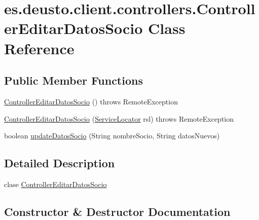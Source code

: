 \hypertarget{classes_1_1deusto_1_1client_1_1controllers_1_1_controller_editar_datos_socio}{}\section{es.\+deusto.\+client.\+controllers.\+Controller\+Editar\+Datos\+Socio Class Reference}
\label{classes_1_1deusto_1_1client_1_1controllers_1_1_controller_editar_datos_socio}
\subsection*{Public Member Functions}
\begin{DoxyCompactItemize}
\item 
\mbox{\hyperlink{classes_1_1deusto_1_1client_1_1controllers_1_1_controller_editar_datos_socio_ac4a645568b10bc53351e97700403d5dd}{Controller\+Editar\+Datos\+Socio}} ()  throws Remote\+Exception 
\item 
\mbox{\hyperlink{classes_1_1deusto_1_1client_1_1controllers_1_1_controller_editar_datos_socio_abddd458cf9a7536335bf85d8431e0e82}{Controller\+Editar\+Datos\+Socio}} (\mbox{\hyperlink{classes_1_1deusto_1_1client_1_1remote_1_1_service_locator}{Service\+Locator}} rsl)  throws Remote\+Exception 
\item 
boolean \mbox{\hyperlink{classes_1_1deusto_1_1client_1_1controllers_1_1_controller_editar_datos_socio_a92198bd925a6799c8805e774c9186094}{update\+Datos\+Socio}} (String nombre\+Socio, String datos\+Nuevos)
\end{DoxyCompactItemize}


\subsection{Detailed Description}
clase \mbox{\hyperlink{classes_1_1deusto_1_1client_1_1controllers_1_1_controller_editar_datos_socio}{Controller\+Editar\+Datos\+Socio}} 

\subsection{Constructor \& Destructor Documentation}
\mbox{\label{classes_1_1deusto_1_1client_1_1controllers_1_1_controller_editar_datos_socio_ac4a645568b10bc53351e97700403d5dd}} 
